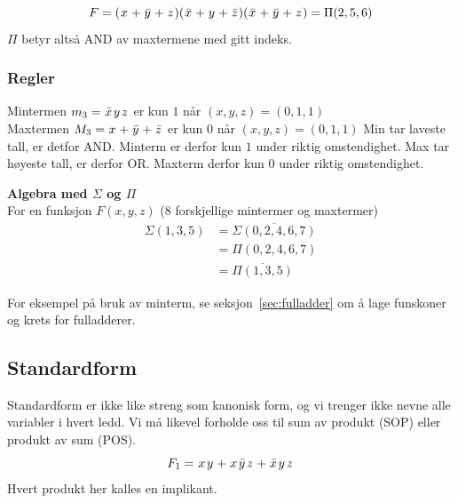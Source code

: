 \documentclass[12pt,a4paper,norsk]{article}
\begin{document}
\[F = (\hspace{0.06em} x\hspace{0.06em}+\hspace{0.06em}\bar{y}\hspace{0.06em}+\hspace{0.06em} z\hspace{0.06em})(\hspace{0.06em}\bar{x}\hspace{0.06em}+\hspace{0.06em} y\hspace{0.06em}+\hspace{0.06em}\bar{z}\hspace{0.06em})(\hspace{0.06em}\bar{x}\hspace{0.06em}+\hspace{0.06em}\bar{y}\hspace{0.06em}+\hspace{0.06em} z\hspace{0.06em}) = \Pi(2,5,6)\]
$\Pi$ betyr altså AND av maxtermene med gitt indeks.

\subsubsection{Regler}
Mintermen $m_{3} = \kom{x}\var{y}\var{z}$ er kun $1$ når $(x,y,z) = (0,1,1)$ \\
Maxtermen $M_{3} = \hspace{0.06em} x\hspace{0.06em}+\hspace{0.06em}\bar{y}\hspace{0.06em}+\hspace{0.06em}\bar{z}\hspace{0.06em}$ er kun $0$ når $(x,y,z) = (0,1,1)$
%
Min tar laveste tall, er detfor AND\@. Minterm er derfor kun $1$ under riktig
omstendighet. Max tar høyeste tall, er derfor OR\@. Maxterm derfor kun $0$ under
riktig omstendighet.

\textbf{Algebra med $\Sigma$ og $\Pi$}\\
For en funksjon $F(x,y,z)$ (8 forskjellige mintermer og maxtermer)
\begin{align*}
  \Sigma(1,3,5) &= \overline{\Sigma(0,2,4,6,7)} \\
           &= \Pi(0,2,4,6,7) \\
           &= \overline{\Pi(1,3,5)}
\end{align*}

For eksempel på bruk av minterm, se seksjon~\ref{sec:fulladder} om å lage
funskoner og krets for fulladderer.

\subsection{Standardform}
Standardform er ikke like streng som kanonisk form, og vi trenger ikke nevne alle
variabler i hvert ledd. Vi må likevel forholde oss til sum av produkt (SOP)
eller produkt av sum (POS).
%
\[F_{1} = \var{x}\var{y} + \var{x}\kom{y}\var{z} + \kom{x}\var{y}\var{z}\]
%
Hvert produkt her kalles en implikant.
\end{document}
